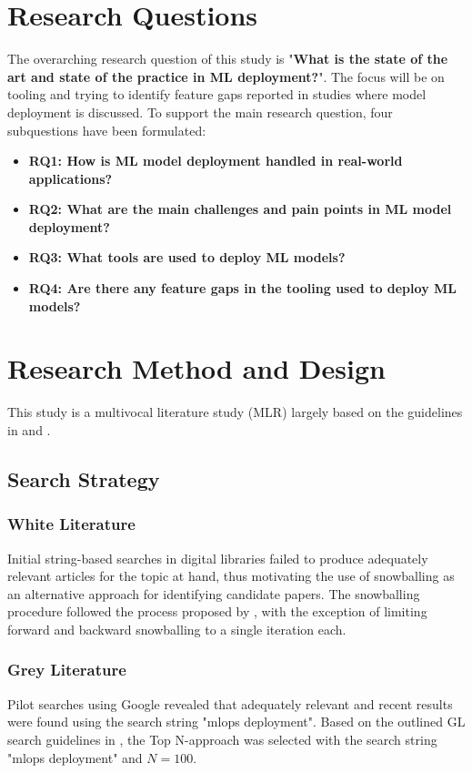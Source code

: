 \section{Research Questions}
\label{sec:research_questions}
The overarching research question of this study is "\textbf{What is the state of the art and state of the practice in ML deployment?}".
The focus will be on tooling and trying to identify feature gaps reported in studies where model deployment is discussed.
To support the main research question, four subquestions have been formulated:
\begin{itemize}
    \item \textbf{RQ1: How is ML model deployment handled in real-world applications?}
    \item \textbf{RQ2: What are the main challenges and pain points in ML model deployment?}
    \item \textbf{RQ3: What tools are used to deploy ML models?}
    \item \textbf{RQ4: Are there any feature gaps in the tooling used to deploy ML models?}
\end{itemize}


\section{Research Method and Design}
\label{sec:research_method}
This study is a multivocal literature study (MLR) largely based on the guidelines in \textcite{Kitchenham07guidelinesfor} and \textcite{Garousi2019}.

\subsection{Search Strategy}
\subsubsection{White Literature}
Initial string-based searches in digital libraries failed to produce adequately relevant articles for the topic at hand, thus motivating the use of snowballing as an alternative approach for identifying candidate papers.
The snowballing procedure followed the process proposed by \textcite{Wohlin2014}, with the exception of limiting forward and backward snowballing to a single iteration each.

\subsubsection{Grey Literature}
Pilot searches using Google revealed that adequately relevant and recent results were found using the search string "mlops deployment".
Based on the outlined GL search guidelines in \cite{Garousi2016}, the Top N-approach was selected with the search string "mlops deployment" and $N=100$.

